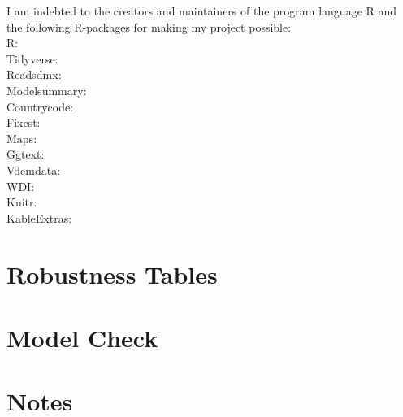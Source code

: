\documentclass[12pt]{report} %
\begin{document}
\newpage
\thispagestyle{empty}
\vspace*{\fill}
\begin{center}
    I am indebted to the creators and maintainers of the program language R and the following R-packages for making my project possible: \\
    R: \citet{r_core_team_r_2024} \\
    Tidyverse: \citet{wickham_welcome_2019} \\
    Readsdmx: \citet{queljoe_readsdmx_2023} \\
    Modelsummary: \citet{arel-bundock_modelsummary_2022} \\
    Countrycode: \citet{arel-bundock_countrycode_2018} \\
    Fixest: \citet{berge_efficient_2018} \\
    Maps: \citet{becker_maps_2024} \\
    Ggtext: \citet{wilke_ggtext_2022} \\
    Vdemdata: \citet{maerz_vdemdata_2025} \\
    WDI: \citet{arel-bundock_wdi_2022} \\
    Knitr: \citet{xie_knitr_2024, xie_dynamic_2015, stodden_knitr_2014} \\
    KableExtras: \citet{zhu_kableextra_2024} \\
    
\end{center}
\vspace*{\fill}

\newpage

\appendix
\chapter{Robustness Tables} \label{apn:robust}


\chapter{Model Check} \label{apn:models}


\chapter{Notes} \label{apn:notes}

\end{document}
